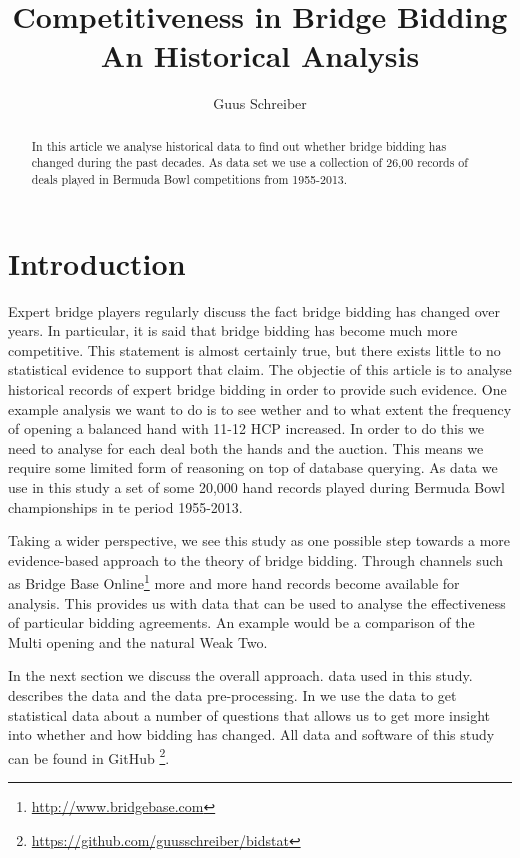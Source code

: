 \documentclass{llncs}
\title{Competitiveness in Bridge Bidding \\ An Historical Analysis}
\author{Guus Schreiber}
\institute{VU University Amsterdam, Computer Science, 
De Boelelaan 1085, 1081 HV Amsterdam, The Netherlands. 
E-mail: \instance{guus.schreiber@vu.nl}}
\begin{document}
\maketitle

\begin{abstract}
In this article we analyse historical data to find out whether bridge bidding has changed during the past decades. As data set we use a collection of 26,00 records of deals played in Bermuda Bowl competitions from 1955-2013.      
\end{abstract}

\section{Introduction}

Expert bridge players regularly discuss the fact bridge bidding has
changed over years. In particular, it is said that bridge bidding has
become much more competitive. This statement is almost certainly true,
but there exists little to no statistical evidence
to support that claim. The objectie of this article is to  analyse
historical records of expert bridge bidding in order to provide such
evidence. One example analysis we want to do is to see wether and to
what extent the
frequency of opening a balanced hand with 11-12 HCP increased. In
order to do this we need to analyse for each deal both the hands and the auction. 
This means we require some limited form of reasoning on top of
database querying.  As data we use in this study a set of some
20,000  hand records played during Bermuda Bowl championships in te
period 1955-2013.  

Taking a wider perspective, we see this study as one possible step
towards  a more evidence-based approach to the theory of bridge
bidding. Through channels such as 
Bridge Base Online\footnote{\url{http://www.bridgebase.com}} more and
more hand records become available for analysis. This provides us with
data that can be used to analyse the effectiveness of particular bidding
agreements. An example would be a comparison of the Multi opening and
the natural Weak Two. 

In the next section we discuss the overall approach.  data used in this
study.  describes the data and the data
pre-processing. In  we use the data to get
statistical data about a number of questions that allows us to get more
insight into whether and how bidding has changed. 
All data and software of this study can be found in GitHub%
\footnote{\url{https://github.com/guusschreiber/bidstat}}.
\end{document}
